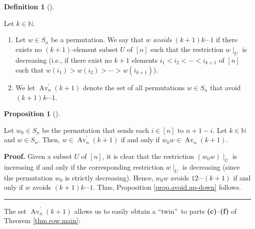 \documentclass[numbers=enddot,12pt,final,onecolumn,notitlepage]{scrartcl}%
\numberwithin{exer}{subsection}
\theoremstyle{definition}
\newtheorem{prop}[theo]{Proposition}
\newenvironment{proposition}[1][]
{\begin{prop}[#1]\begin{leftbar}}
{\end{leftbar}\end{prop}}
\newtheorem{defi}[theo]{Definition}
\newenvironment{definition}[1][]
{\begin{defi}[#1]\begin{leftbar}}
{\end{leftbar}\end{defi}}
\newenvironment{proof}[1][Proof]{\noindent\textbf{#1.} }{\ \rule{0.5em}{0.5em}}
\begin{document}
\begin{definition}
\label{def.avoid.down}Let $k\in\mathbb{N}$.

\begin{enumerate}
\item[\textbf{(a)}] Let $w\in S_{n}$ be a permutation. We say that $w$
\emph{avoids }$\left(  k+1\right)  k\cdots1$ if there exists no $\left(
k+1\right)  $-element subset $U$ of $\left[  n\right]  $ such that the
restriction $w\mid_{U}$ is decreasing (i.e., if there exist no $k+1$ elements
$i_{1}<i_{2}<\cdots<i_{k+1}$ of $\left[  n\right]  $ such that $w\left(
i_{1}\right)  >w\left(  i_{2}\right)  >\cdots>w\left(  i_{k+1}\right)  $).

\item[\textbf{(b)}] We let $\operatorname*{Av}\nolimits_{n}^{\prime}\left(
k+1\right)  $ denote the set of all permutations $w\in S_{n}$ that avoid
$\left(  k+1\right)  k\cdots1$.
\end{enumerate}
\end{definition}

\begin{proposition}
\label{prop.avoid.up-down}Let $w_{0}\in S_{n}$ be the permutation that sends
each $i\in\left[  n\right]  $ to $n+1-i$. Let $k\in\mathbb{N}$ and $w\in
S_{n}$. Then, $w\in\operatorname*{Av}\nolimits_{n}^{\prime}\left(  k+1\right)
$ if and only if $w_{0}w\in\operatorname*{Av}\nolimits_{n}\left(  k+1\right)
$.
\end{proposition}

\begin{proof}
Given a subset $U$ of $\left[  n\right]  $, it is clear that the restriction
$\left(  w_{0}w\right)  \mid_{U}$ is increasing if and only if the
corresponding restriction $w\mid_{U}$ is decreasing (since the permutation
$w_{0}$ is strictly decreasing). Hence, $w_{0}w$ avoids $12\cdots\left(
k+1\right)  $ if and only if $w$ avoids $\left(  k+1\right)  k\cdots1$. Thus,
Proposition \ref{prop.avoid.up-down} follows.
\end{proof}

The set $\operatorname*{Av}\nolimits_{n}^{\prime}\left(  k+1\right)  $ allows
us to easily obtain a \textquotedblleft twin\textquotedblright\ to parts
\textbf{(c)}--\textbf{(f)} of Theorem \ref{thm.row.main}:
\end{document}
